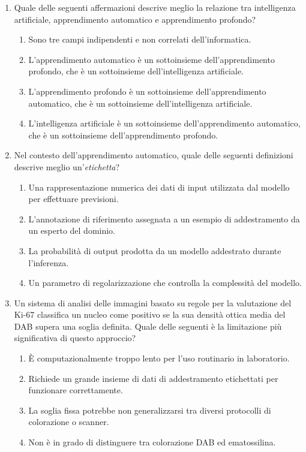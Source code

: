 \begin{enumerate}

    \item \label{ch3:q1} Quale delle seguenti affermazioni descrive meglio la relazione tra intelligenza artificiale, apprendimento automatico e apprendimento profondo?
    \begin{enumerate}[label=\Alph*.]
        \item Sono tre campi indipendenti e non correlati dell'informatica.
        \item L'apprendimento automatico è un sottoinsieme dell'apprendimento profondo, che è un sottoinsieme dell'intelligenza artificiale.
        \item L'apprendimento profondo è un sottoinsieme dell'apprendimento automatico, che è un sottoinsieme dell'intelligenza artificiale.
        \item L'intelligenza artificiale è un sottoinsieme dell'apprendimento automatico, che è un sottoinsieme dell'apprendimento profondo.
    \end{enumerate}

    \item \label{ch3:q2} Nel contesto dell'apprendimento automatico, quale delle seguenti definizioni descrive meglio un'\textit{etichetta}?
    \begin{enumerate}[label=\Alph*.]
        \item Una rappresentazione numerica dei dati di input utilizzata dal modello per effettuare previsioni.
        \item L'annotazione di riferimento assegnata a un esempio di addestramento da un esperto del dominio.
        \item La probabilità di output prodotta da un modello addestrato durante l'inferenza.
        \item Un parametro di regolarizzazione che controlla la complessità del modello.
    \end{enumerate}

    \item \label{ch3:q3} Un sistema di analisi delle immagini basato su regole per la valutazione del Ki-67 classifica un nucleo come positivo se la sua densità ottica media del DAB supera una soglia definita. Quale delle seguenti è la limitazione più significativa di questo approccio?
    \begin{enumerate}[label=\Alph*.]
        \item È computazionalmente troppo lento per l'uso routinario in laboratorio.
        \item Richiede un grande insieme di dati di addestramento etichettati per funzionare correttamente.
        \item La soglia fissa potrebbe non generalizzarsi tra diversi protocolli di colorazione o scanner.
        \item Non è in grado di distinguere tra colorazione DAB ed ematossilina.
    \end{enumerate}


\end{enumerate}
